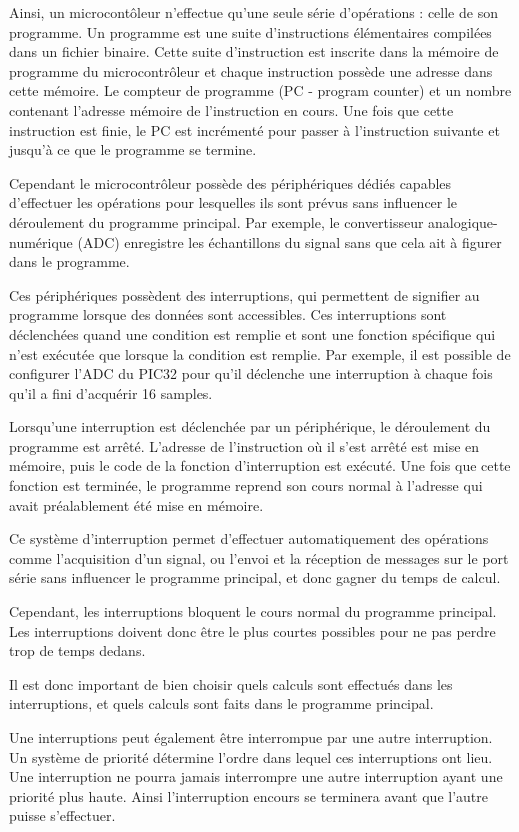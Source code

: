 \documentclass[letterpaper, twoside, 12pt, memoire, creativecommons, hyperref]{thETS}
\begin{document}
Ainsi, un microcontôleur n'effectue qu'une seule série d'opérations : celle de son programme. Un programme est une suite d'instructions élémentaires compilées dans un fichier binaire. Cette suite d'instruction est inscrite dans la mémoire de programme du microcontrôleur et chaque instruction possède une adresse dans cette mémoire. Le compteur de programme (PC - program counter) et un nombre contenant l'adresse mémoire de l'instruction en cours. Une fois que cette instruction est finie, le PC est incrémenté pour passer à l'instruction suivante et jusqu'à ce que le programme se termine. 

Cependant le microcontrôleur possède des périphériques dédiés capables d'effectuer les opérations pour lesquelles ils sont prévus sans influencer le déroulement du programme principal. Par exemple, le convertisseur analogique-numérique (ADC) enregistre les échantillons du signal sans que cela ait à figurer dans le programme. 

Ces périphériques possèdent des interruptions, qui permettent de signifier au programme lorsque des données sont accessibles. Ces interruptions sont déclenchées quand une condition est remplie et sont une fonction spécifique qui n'est exécutée que lorsque la condition est remplie. Par exemple, il est possible de configurer l'ADC du PIC32 pour qu'il déclenche une interruption à chaque fois qu'il a fini d'acquérir 16 samples. 

Lorsqu'une interruption est déclenchée par un périphérique, le déroulement du programme est arrêté. L'adresse de l'instruction où il s'est arrêté est mise en mémoire, puis le code de la fonction d'interruption est exécuté. Une fois que cette fonction est terminée, le programme reprend son cours normal à l'adresse qui avait préalablement été mise en mémoire. 

Ce système d'interruption permet d'effectuer automatiquement des opérations comme l'acquisition d'un signal, ou l'envoi et la réception de messages sur le port série sans influencer le programme principal, et donc gagner du temps de calcul. 

Cependant, les interruptions bloquent le cours normal du programme principal. Les interruptions doivent donc être le plus courtes possibles pour ne pas perdre trop de temps dedans. 

Il est donc important de bien choisir quels calculs sont effectués dans les interruptions, et quels calculs sont faits dans le programme principal. 

Une interruptions peut également être interrompue par une autre interruption. Un système de priorité détermine l'ordre dans lequel ces interruptions ont lieu. Une interruption ne pourra jamais interrompre une autre interruption ayant une priorité plus haute. Ainsi l'interruption encours se terminera avant que l'autre puisse s'effectuer. 
\end{document}
